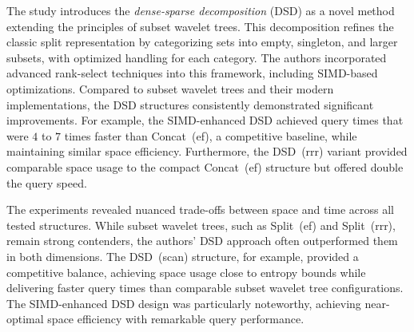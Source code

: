 \noindent The study introduces the \emph{dense-sparse decomposition} (DSD) as a novel method extending the principles of subset wavelet trees. This decomposition refines the classic split representation by categorizing sets into empty, singleton, and larger subsets, with optimized handling for each category. The authors incorporated advanced rank-select techniques into this framework, including SIMD-based optimizations. Compared to subset wavelet trees and their modern implementations, the DSD structures consistently demonstrated significant improvements. For example, the SIMD-enhanced DSD achieved query times that were $4$ to $7$ times faster than Concat~(ef), a competitive baseline, while maintaining similar space efficiency. Furthermore, the DSD~(rrr) variant provided comparable space usage to the compact Concat~(ef) structure but offered double the query speed.

\noindent The experiments revealed nuanced trade-offs between space and time across all tested structures. While subset wavelet trees, such as Split~(ef) and Split~(rrr), remain strong contenders, the authors' DSD approach often outperformed them in both dimensions. The DSD~(scan) structure, for example, provided a competitive balance, achieving space usage close to entropy bounds while delivering faster query times than comparable subset wavelet tree configurations. The SIMD-enhanced DSD design was particularly noteworthy, achieving near-optimal space efficiency with remarkable query performance.
